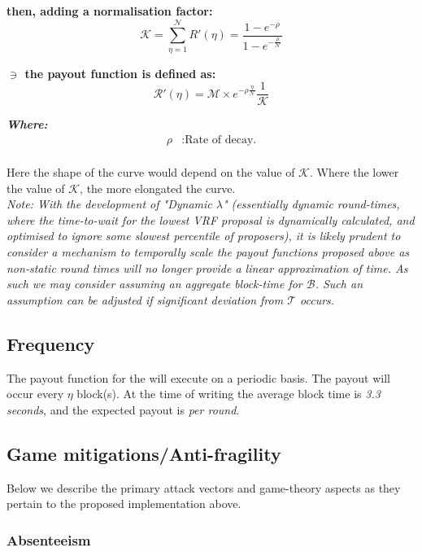 \documentclass[11pt,a4paper]{article}
\begin{document}
\textbf{then, adding a normalisation factor:}
\[
\mathcal{K} = \sum_{\eta=1}^\mathcal{N}R'(\eta)= \frac{1-e^{-\rho}}{1-e^{-\frac{\rho}{\mathcal{N}}}}
\]

\textbf{$\ni$ the payout function is defined as:}
\[
\mathcal{R'}(\eta)= \mathcal{M}\times e^{-\rho\frac{\eta}{\mathcal{N}}} \frac{1}{\mathcal{K}}
\]

\textbf{\emph{Where:}}
\begin{align*}
\rho & : \text{Rate of decay.} \\
\end{align*}

Here the shape of the curve would depend on the value of \(\mathcal{K}\). Where the lower the value of \(\mathcal{K}\), 
the more elongated the curve. \\

\emph{Note: With the development of "Dynamic $\lambda$" (essentially dynamic round-times, where the time-to-wait for the
lowest VRF proposal is dynamically calculated, and optimised to ignore some slowest percentile of proposers), it is 
likely prudent to consider a mechanism to temporally scale the payout functions proposed above as non-static round times 
will no longer provide a linear approximation of time. As such we may consider assuming an aggregate block-time for 
$\mathcal{B}$. Such an assumption can be adjusted if significant deviation from $\mathcal{T}$ occurs.}

\subsection{Frequency}
The payout function for the  will execute on a periodic basis. The payout will occur every 
$\eta$ block(s). At the time of writing the average block time is \emph{3.3 seconds}, and the expected payout is 
\textit{per round}. 

\pagebreak

\subsection{Game mitigations/Anti-fragility}
Below we describe the primary attack vectors and game-theory aspects as they pertain to the proposed implementation 
above.

\subsubsection{Absenteeism} \label{subsubsec:absenteeism}
\end{document}
